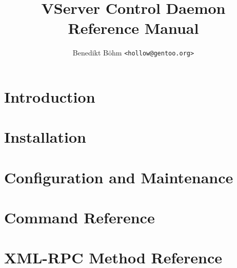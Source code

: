 \documentclass[a4paper,10pt,oneside]{scrbook}
\title{VServer Control Daemon\\Reference Manual}
\author{Benedikt Böhm \texttt{<hollow@gentoo.org>}}
\begin{document}
\maketitle

\frontmatter
\setcounter{tocdepth}{1}
\tableofcontents


\mainmatter
\part{Introduction}




\part{Installation}

\part{Configuration and Maintenance}

\part{Command Reference}






\part{XML-RPC Method Reference}







\backmatter

\end{document}
